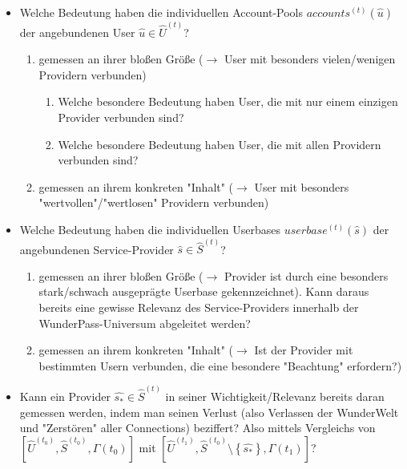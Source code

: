 \begin{itemize}
  \item Welche Bedeutung haben die individuellen Account-Pools $accounts^{(t)}(\widehat{u})$ der angebundenen User $\widehat{u} \in \widehat{U}^{(t)}$?
  	\begin{enumerate}[label=(\alph*)]
  	\item gemessen an ihrer bloßen Größe ($\rightarrow$ User mit besonders vielen/wenigen Providern verbunden) 	
  		\begin{enumerate}[label=(\roman*)]
  		\item Welche besondere Bedeutung haben User, die mit nur einem einzigen Provider verbunden sind?
  		\item Welche besondere Bedeutung haben User, die mit allen Providern verbunden sind?
  		\end{enumerate}  	 	
  	\item gemessen an ihrem konkreten "Inhalt" ($\rightarrow$ User mit besonders "wertvollen"/"wertlosen" Providern verbunden)
  	\end{enumerate}  	
  \item Welche Bedeutung haben die individuellen Userbases $userbase^{(t)}(\widehat{s})$ der angebundenen Service-Provider $\widehat{s} \in \widehat{S}^{(t)}$?
  	\begin{enumerate}[label=(\alph*)]
  	\item gemessen an ihrer bloßen Größe ($\rightarrow$ Provider ist durch eine besonders stark/schwach ausgeprägte Userbase gekennzeichnet). Kann daraus bereits eine gewisse Relevanz des Service-Providers innerhalb der WunderPass-Universum abgeleitet werden? 	 	
  	\item gemessen an ihrem konkreten "Inhalt" ($\rightarrow$ Ist der Provider mit bestimmten Usern verbunden, die eine besondere "Beachtung" erfordern?)
  	\end{enumerate}
  \item Kann ein Provider $\widehat{s_{*}} \in \widehat{S}^{(t)}$ in seiner Wichtigkeit/Relevanz bereits daran gemessen werden, indem man seinen Verlust (also Verlassen der WunderWelt und "Zerstören" aller Connections) beziffert? Also mittels Vergleichs von $\left[ \widehat{U}^{(t_0)}, \widehat{S}^{(t_0)}, \Gamma(t_0) \right]$ mit $\left[ \widehat{U}^{(t_1)}, \widehat{S}^{(t_0)} \setminus \left\{\widehat{s_{*}}\right\}, \Gamma(t_1) \right]$?
\end{itemize}


\vspace{0.6cm}


